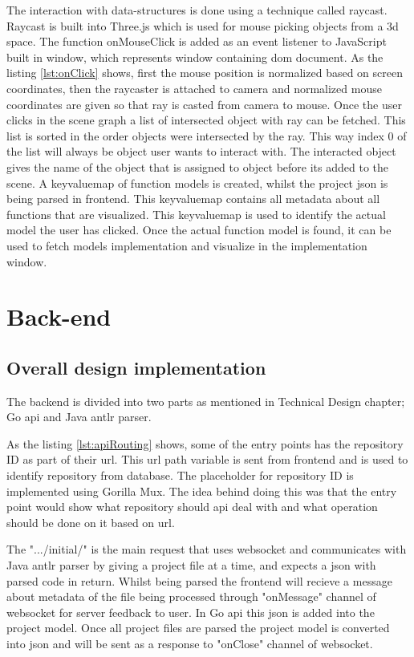 The interaction with data-structures is done using a technique called raycast. Raycast is built into Three.js which is used for mouse picking objects from a 3d space. The function onMouseClick is added as an event listener to JavaScript built in window, which represents window containing \gls{dom} document. As the listing \ref{lst:onClick} shows, first the mouse position is normalized based on screen coordinates, then the raycaster is attached to camera and normalized mouse coordinates are given so that ray is casted from camera to mouse. Once the user clicks in the scene graph a list of intersected object with ray can be fetched. This list is sorted in the order objects were intersected by the ray. This way index 0 of the list will always be object user wants to interact with. The interacted object gives the name of the object that is assigned to object before its added to the scene. A \gls{keyvaluemap} of function models is created, whilst the project json is being parsed in \gls{frontend}. This \gls{keyvaluemap} contains all metadata about all functions that are visualized. This \gls{keyvaluemap} is used to identify the actual model the user has clicked. Once the actual function model is found, it can be used to fetch models implementation and visualize in the implementation window. 

\section{Back-end}

\subsection{Overall design implementation}

The \gls{backend} is divided into two parts as mentioned in Technical Design chapter; Go \gls{api} and Java \gls{antlr} parser.

As the listing \ref{lst:apiRouting} shows, some of the entry points has the repository ID as part of their \gls{url}. This \gls{url} path variable is sent from \gls{frontend} and is used to identify repository from database. The placeholder for repository ID is implemented using Gorilla Mux. The idea behind doing this was that the entry point would show what repository should \gls{api} deal with and what operation should be done on it based on \gls{url}. 

The ".../initial/" is the main request that uses \gls{websocket} and communicates with Java \gls{antlr} parser by giving a project file at a time, and expects a \gls{json} with parsed code in return. Whilst being parsed the \gls{frontend} will recieve a message about metadata of the file being processed through "onMessage" channel of \gls{websocket} for server feedback to user. In Go \gls{api} this \gls{json} is added into the project model. Once all project files are parsed the project model is converted into \gls{json} and will be sent as a response to "onClose" channel of \gls{websocket}. 

